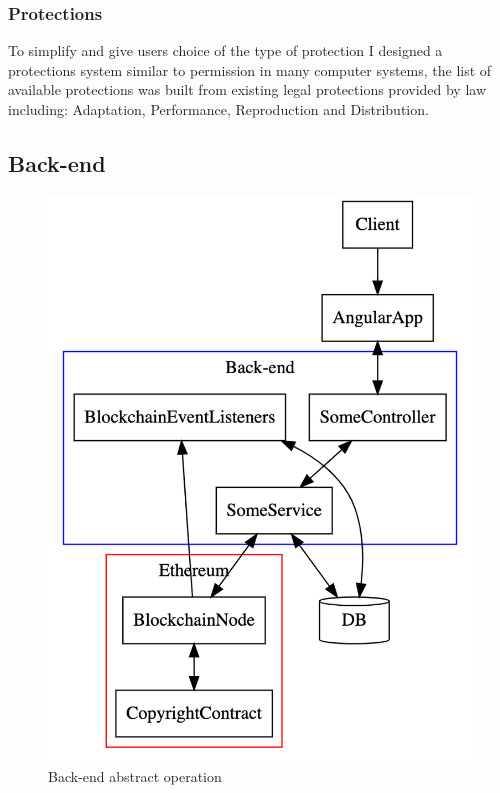 \subsubsection{Protections}

To simplify and give users choice of the type of protection I designed a protections system similar to permission in many computer systems, the list of available protections was built from existing legal protections provided by  law \cite{rights_granted} including: Adaptation, Performance, Reproduction and Distribution. 

\subsection{Back-end}

\begin{figure}[H]
\caption{Back-end abstract operation}
\centering
\includegraphics[width=\textwidth,height=0.4\textheight,keepaspectratio]{images/operational/example-backend}
\centering
\end{figure}

